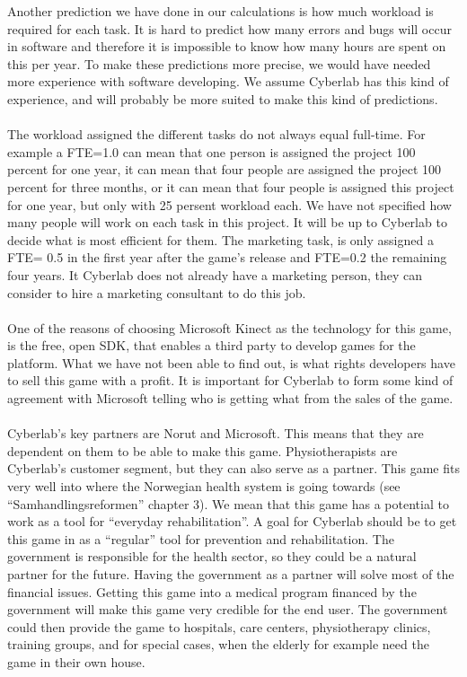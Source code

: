 Another prediction we have done in our calculations is how much workload is required for each task. It is hard to predict how many errors and bugs will occur in software and therefore it is impossible to know how many hours are spent on this per year. To make these predictions more precise, we would have needed more experience with software developing. We assume Cyberlab has this kind of experience, and will probably be more suited to make this kind of predictions.\\ \\
The workload assigned the different tasks do not always equal full-time. For example a FTE=1.0 can mean that one person is assigned the project 100 percent for one year, it can mean that four people are assigned the project 100 percent for three months, or it can mean that four people is assigned this project for one year, but only with 25 persent workload each. We have not specified how many people will work on each task in this project. It will be up to Cyberlab to decide what is most efficient for them. The marketing task, is only assigned a FTE= 0.5 in the first year after the game’s release and FTE=0.2 the remaining four years. It Cyberlab does not already have a marketing person, they can consider to hire a marketing consultant to do this job. \\ \\
One of the reasons of choosing Microsoft Kinect as the technology for this game, is the free, open SDK, that enables a third party to develop games for the platform. What we have not been able to find out, is what rights developers have to sell this game with a profit. It is important for Cyberlab to form some kind of agreement with Microsoft telling who is getting what from the sales of the game. \\ \\
Cyberlab’s key partners are Norut and Microsoft. This means that they are dependent on them to be able to make this game.
Physiotherapists are Cyberlab's customer segment, but they can also serve as a partner. This game fits very well into where the Norwegian health system is going towards (see “Samhandlingsreformen” chapter 3). We mean that this game has a potential to work as a tool for “everyday rehabilitation”. A goal for Cyberlab should be to get this game in as a “regular” tool for prevention and rehabilitation. The government is responsible for the health sector, so they could be a natural partner for the future. Having the government as a partner will solve most of the financial issues. Getting this game into a medical program financed by the government will make this game very credible for the end user. The government could then provide the game to hospitals, care centers, physiotherapy clinics, training groups, and for special cases, when the elderly for example need the game in their own house. \\ \\ 




